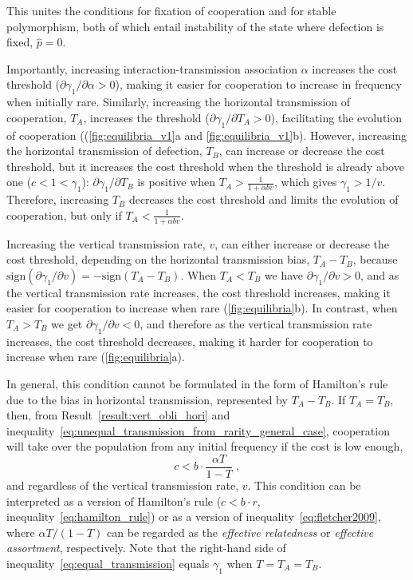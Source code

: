 \documentclass[12pt]{extarticle}
\begin{document}
This unites the conditions for fixation of cooperation and for stable polymorphism, both of which entail instability of the state where defection is fixed, $\hat{p}=0$.

Importantly, increasing interaction-transmission association $\alpha$ increases the cost threshold ($\partial \gamma_1 / \partial \alpha > 0$), making it easier for cooperation to increase in frequency when initially rare.
Similarly, increasing the horizontal transmission of cooperation, $T_A$, increases the threshold ($\partial \gamma_1 / \partial T_A > 0$), facilitating the evolution of cooperation ((\autoref{fig:equilibria_v1}a and \ref{fig:equilibria_v1}b).
However, increasing the horizontal transmission of defection, $T_B$, can increase or decrease the cost threshold, but it increases the cost threshold when the threshold is already above one ($c<1<\gamma_1$): $\partial\gamma_1/\partial T_B$ is positive when $T_A > \frac{1}{1+\alpha b v}$, which gives $\gamma_1>1/v$. 
Therefore, increasing $T_B$ decreases the cost threshold and limits the evolution of cooperation, but only if $T_A < \frac{1}{1+\alpha b v}$.

Increasing the vertical transmission rate, $v$, can either increase or decrease the cost threshold, depending on the horizontal transmission bias, $T_A-T_B$, because $\text{sign}(\partial \gamma_1 / \partial v) = -\text{sign}(T_A-T_B)$.
When $T_A<T_B$ we have $\partial \gamma_1 / \partial v >0$, and as the vertical transmission rate increases, the cost threshold increases, making it easier for cooperation to increase when rare (\autoref{fig:equilibria}b). 
In contrast, when $T_A > T_B$ we get $\partial \gamma_1 / \partial v <0$, and therefore as the vertical transmission rate increases, the cost threshold decreases, making it harder for cooperation to increase when rare (\autoref{fig:equilibria}a).

In general, this condition cannot be formulated in the form of Hamilton's rule due to the bias in horizontal transmission, represented by $T_A-T_B$.
If $T_A=T_B$, then, from Result~\ref{result:vert_obli_hori} and inequality~\ref{eq:unequal_transmission_from_rarity_general_case}, cooperation will take over the population from any initial frequency if the cost is low enough,
\begin{equation}
\label{eq:equal_transmission}
c < b \cdot \frac{\alpha T}{1-T} \;,
\end{equation}
and regardless of the vertical transmission rate, $v$.
This condition can be interpreted as a version of Hamilton's rule  ($c<b\cdot r$, inequality~\ref{eq:hamilton_rule}) or as a version of inequality~\ref{eq:fletcher2009}, where $\alpha T/(1-T)$ can be regarded as the \emph{effective relatedness} or \emph{effective assortment}, respectively.
Note that the right-hand side of inequality~\ref{eq:equal_transmission} equals $\gamma_1$ when $T=T_A=T_B$.
\end{document}
